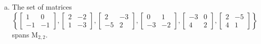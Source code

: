 \begin{exerciseAnswer}
\begin{enumerate}[(a)]
\item The set of matrices \( \left\{ \left[\begin{array}{cc}
1 & 0 \\
-1 & -1
\end{array}\right] , \left[\begin{array}{cc}
2 & -2 \\
1 & -3
\end{array}\right] , \left[\begin{array}{cc}
2 & -3 \\
-5 & 2
\end{array}\right] , \left[\begin{array}{cc}
0 & 1 \\
-3 & -2
\end{array}\right] , \left[\begin{array}{cc}
-3 & 0 \\
4 & 2
\end{array}\right] , \left[\begin{array}{cc}
2 & -5 \\
4 & 1
\end{array}\right] \right\} \) spans \(\mathrm{M}_{2,2}\). 
\end{enumerate}
    
\end{exerciseAnswer}
    

